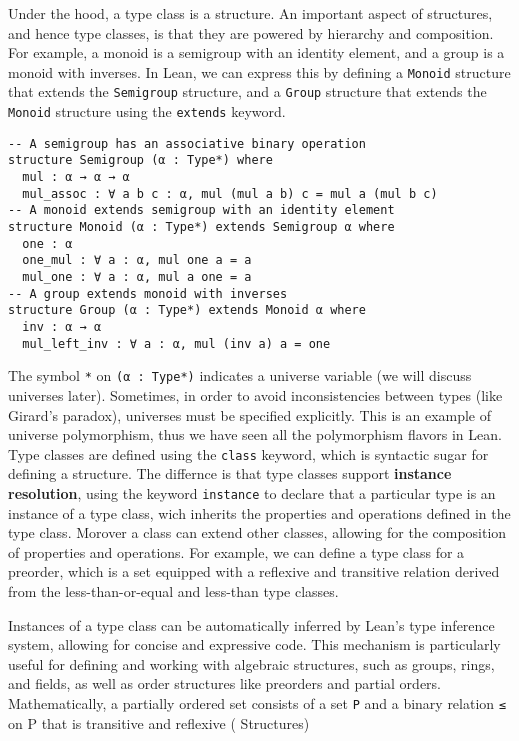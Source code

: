 Under the hood, a type class is a structure. An important aspect of structures,
and hence type classes, is that they are powered by hierarchy and composition.
For example, a monoid is a semigroup with an identity element, and a group is a monoid with inverses. In Lean, we can express this
by defining a \lstinline[language=lean]|Monoid| structure that extends 
the \lstinline[language=lean]|Semigroup| structure, 
and a \lstinline[language=lean]|Group| structure 
that extends the \lstinline[language=lean]|Monoid| structure
using the \lstinline[language=lean]|extends| keyword.

\begin{lstlisting}[language=lean]
-- A semigroup has an associative binary operation
structure Semigroup (α : Type*) where
  mul : α → α → α
  mul_assoc : ∀ a b c : α, mul (mul a b) c = mul a (mul b c)
-- A monoid extends semigroup with an identity element  
structure Monoid (α : Type*) extends Semigroup α where
  one : α
  one_mul : ∀ a : α, mul one a = a
  mul_one : ∀ a : α, mul a one = a  
-- A group extends monoid with inverses
structure Group (α : Type*) extends Monoid α where
  inv : α → α
  mul_left_inv : ∀ a : α, mul (inv a) a = one     
\end{lstlisting}

The symbol \lstinline[language=lean]|*| on  \lstinline[language=lean]|(α : Type*)| 
indicates a universe variable (we will discuss universes later). Sometimes, 
in order to avoid
inconsistencies between types (like Girard's paradox), universes must be specified explicitly. 
This is an example
of universe polymorphism, thus we have seen all the polymorphism flavors in Lean.
Type classes are defined using the \lstinline[language=lean]|class| keyword, 
which is syntactic sugar for defining a structure.
The differnce is that type classes support \textbf{instance resolution}, using the keyword 
\lstinline[language=lean]|instance| to declare that a particular type is an instance of a type class, wich inherits 
the properties and operations defined in the type class.
Morover a class can extend other classes, allowing for the composition of properties and operations.
For example, we can define a type class for a preorder, which is a set equipped with
a reflexive and transitive relation derived from the less-than-or-equal and less-than type classes.

Instances of a type class can be automatically inferred by Lean's type inference system,
allowing for concise and expressive code.
This mechanism is particularly useful for defining and working with algebraic structures,
such as groups, rings, and fields, as well as order structures like preorders and partial orders.
Mathematically, a partially ordered set consists of a set \lstinline[language=lean]|P| 
and a binary relation 
\lstinline[language=lean]|≤| 
on P that is transitive and reflexive (\cite{mathinlean} Structures)

